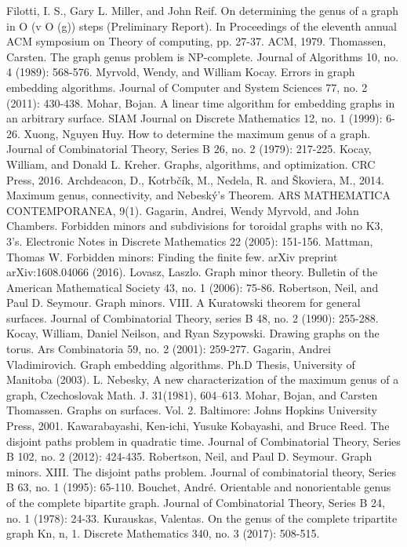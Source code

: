\documentclass[12pt,conference]{IEEEtran}
\begin{document}
\begin{thebibliography}{1}
 Filotti, I. S., Gary L. Miller, and John Reif. On determining the genus of a graph in O (v O (g)) steps (Preliminary Report). In Proceedings of the eleventh annual ACM symposium on Theory of computing, pp. 27-37. ACM, 1979.
 Thomassen, Carsten. The graph genus problem is NP-complete. Journal of Algorithms 10, no. 4 (1989): 568-576.
 Myrvold, Wendy, and William Kocay. Errors in graph embedding algorithms. Journal of Computer and System Sciences 77, no. 2 (2011): 430-438.
 Mohar, Bojan. A linear time algorithm for embedding graphs in an arbitrary surface. SIAM Journal on Discrete Mathematics 12, no. 1 (1999): 6-26.
 Xuong, Nguyen Huy. How to determine the maximum genus of a graph. Journal of Combinatorial Theory, Series B 26, no. 2 (1979): 217-225.
 Kocay, William, and Donald L. Kreher. Graphs, algorithms, and optimization. CRC Press, 2016.
 Archdeacon, D., Kotrbčík, M., Nedela, R. and Škoviera, M., 2014. Maximum genus, connectivity, and Nebeský's Theorem. ARS MATHEMATICA CONTEMPORANEA, 9(1).
 Gagarin, Andrei, Wendy Myrvold, and John Chambers. Forbidden minors and subdivisions for toroidal graphs with no K3, 3's. Electronic Notes in Discrete Mathematics 22 (2005): 151-156.
 Mattman, Thomas W. Forbidden minors: Finding the finite few. arXiv preprint arXiv:1608.04066 (2016).
 Lovasz, Laszlo. Graph minor theory. Bulletin of the American Mathematical Society 43, no. 1 (2006): 75-86.
 Robertson, Neil, and Paul D. Seymour. Graph minors. VIII. A Kuratowski theorem for general surfaces. Journal of Combinatorial Theory, series B 48, no. 2 (1990): 255-288.
 Kocay, William, Daniel Neilson, and Ryan Szypowski. Drawing graphs on the torus. Ars Combinatoria 59, no. 2 (2001): 259-277.
 Gagarin, Andrei Vladimirovich. Graph embedding algorithms. Ph.D Thesis, University of Manitoba (2003).
 L. Nebesky, A new characterization of the maximum genus of a graph, Czechoslovak Math. J. 31(1981), 604–613.
 Mohar, Bojan, and Carsten Thomassen. Graphs on surfaces. Vol. 2. Baltimore: Johns Hopkins University Press, 2001.
 Kawarabayashi, Ken-ichi, Yusuke Kobayashi, and Bruce Reed. The disjoint paths problem in quadratic time. Journal of Combinatorial Theory, Series B 102, no. 2 (2012): 424-435.
 Robertson, Neil, and Paul D. Seymour. Graph minors. XIII. The disjoint paths problem. Journal of combinatorial theory, Series B 63, no. 1 (1995): 65-110.
 Bouchet, André. Orientable and nonorientable genus of the complete bipartite graph. Journal of Combinatorial Theory, Series B 24, no. 1 (1978): 24-33.
 Kurauskas, Valentas. On the genus of the complete tripartite graph Kn, n, 1. Discrete Mathematics 340, no. 3 (2017): 508-515.
\end{thebibliography}
\end{document}
